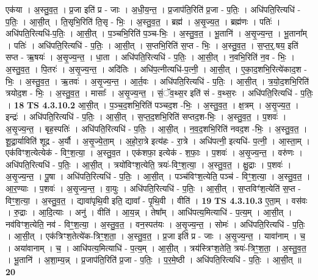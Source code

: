 \documentclass[17pt]{extarticle}
\begin{document}
                  एक॑या । अ॒स्तु॒व॒त॒ । प्र॒जा इति॑ प्र - जाः । अ॒धी॒य॒न्त॒ । प्र॒जाप॑ति॒रिति॑ प्र॒जा - प॒तिः॒ । अधि॑पति॒रित्यधि॑ - प॒तिः॒ । आ॒सी॒त् । ति॒सृभि॒रिति॑ ति॒सृ - भिः॒ । अ॒स्तु॒व॒त॒ । ब्रह्म॑ । अ॒सृ॒ज्य॒त॒ । ब्रह्म॑णः । पतिः॑ । अधि॑पति॒रित्यधि॑-प॒तिः॒ । आ॒सी॒त् । प॒ञ्चभि॒रिति॑ प॒ञ्च-भिः॒ । अ॒स्तु॒व॒त॒ । भू॒तानि॑ । अ॒सृ॒ज्य॒न्त॒ । भू॒ताना᳚म् । पतिः॑ । अधि॑पति॒रित्यधि॑ - प॒तिः॒ । आ॒सी॒त् । स॒प्तभि॒रिति॑ स॒प्त - भिः॒ । अ॒स्तु॒व॒त॒ । स॒प्त॒र्॒.षय॒ इति॑ सप्त - ऋ॒षयः॑ । अ॒सृ॒ज्य॒न्त॒ । धा॒ता । अधि॑पति॒रित्यधि॑ - प॒तिः॒ । आ॒सी॒त् । न॒वभि॒रिति॑ न॒व - भिः॒ । अ॒स्तु॒व॒त॒ । पि॒तरः॑ । अ॒सृ॒ज्य॒न्त॒ । अदि॑तिः । अधि॑प॒त्नीत्यधि॑-प॒त्नी॒ । आ॒सी॒त् । ए॒का॒द॒शभि॒रित्ये॑काद॒श - भिः॒ । अ॒स्तु॒व॒त॒ । ऋ॒तवः॑ । अ॒सृ॒ज्य॒न्त॒ । आ॒र्त॒वः । अधि॑पति॒रित्यधि॑ - प॒तिः॒ । आ॒सी॒त् । त्र॒यो॒द॒शभि॒रिति॑ त्रयोद॒श - भिः॒ । अ॒स्तु॒व॒त॒ । मासाः᳚ । अ॒सृ॒ज्य॒न्त॒ । सं॒ॅव॒थ्स॒र इति॑ सं - व॒थ्स॒रः । अधि॑पति॒रित्यधि॑ - प॒तिः॒ । \textbf{  18} \newline
                  \newline
                                \textbf{ TS 4.3.10.2} \newline
                  आ॒सी॒त् । प॒ञ्च॒द॒शभि॒रिति॑ पञ्चद॒श -भिः॒ । अ॒स्तु॒व॒त॒ । क्ष॒त्रम् । अ॒सृ॒ज्य॒त॒ । इन्द्रः॑ । अधि॑पति॒रित्यधि॑ - प॒तिः॒ । आ॒सी॒त् । स॒प्त॒द॒शभि॒रिति॑ सप्तद॒श-भिः॒ । अ॒स्तु॒व॒त॒ । प॒शवः॑ । अ॒सृ॒ज्य॒न्त॒ । बृह॒स्पतिः॑ । अधि॑पति॒रित्यधि॑ - प॒तिः॒ । आ॒सी॒त् । न॒व॒द॒शभि॒रिति॑ नवद॒श -भिः॒ । अ॒स्तु॒व॒त॒ । शू॒द्रा॒र्याविति॑ शूद्र - अ॒र्यौ । अ॒सृ॒ज्ये॒ता॒म् । अ॒हो॒रा॒त्रे इत्य॑हः - रा॒त्रे । अधि॑पत्नी॒ इत्यधि॑- प॒त्नी॒ । आ॒स्ता॒म् । एक॑विꣳश॒त्येत्येक॑ - विꣳ॒॒श॒त्या॒ । अ॒स्तु॒व॒त । एक॑शफा॒ इत्येक॑ - श॒फाः॒ । प॒शवः॑ । अ॒सृ॒ज्य॒न्त॒ । वरु॑णः । अधि॑पति॒रित्यधि॑ - प॒तिः॒ । आ॒सी॒त् । त्रयो॑विꣳश॒त्येति॒ त्रयः॑-विꣳ॒॒श॒त्या॒ । अ॒स्तु॒व॒त॒ । क्षु॒द्राः । प॒शवः॑ । अ॒सृ॒ज्य॒न्त॒ । पू॒षा । अधि॑पति॒रित्यधि॑ - प॒तिः॒ । आ॒सी॒त् । पञ्च॑विꣳश॒त्येति॒ पञ्च॑ - विꣳ॒॒श॒त्या॒ । अ॒स्तु॒व॒त॒ । आ॒र॒ण्याः । प॒शवः॑ । अ॒सृ॒ज्य॒न्त॒ । वा॒युः । अधि॑पति॒रित्यधि॑ - प॒तिः॒ । आ॒सी॒त् । स॒प्तविꣳ॑श॒त्येति॑ स॒प्त - विꣳ॒॒श॒त्या॒ । अ॒स्तु॒व॒त॒ । द्यावा॑पृथि॒वी इति॒ द्यावा᳚ - पृ॒थि॒वी । वीति॑ । \textbf{  19} \newline
                  \newline
                                \textbf{ TS 4.3.10.3} \newline
                  ए॒ता॒म् । वस॑वः । रु॒द्राः । आ॒दि॒त्याः । अनु॑ । वीति॑ । आ॒य॒न्न् । तेषा᳚म् । आधि॑पत्य॒मित्याधि॑ - प॒त्य॒म् । आ॒सी॒त् । नव॑विꣳश॒त्येति॒ नव॑ - विꣳ॒॒श॒त्या॒ । अ॒स्तु॒व॒त॒ । वन॒स्पत॑यः । अ॒सृ॒ज्य॒न्त॒ । सोमः॑ । अधि॑पति॒रित्यधि॑ - प॒तिः॒ । आ॒सी॒त् । एक॑त्रिꣳश॒तेत्ये॑क-त्रिꣳ॒॒श॒ता॒ । अ॒स्तु॒व॒त॒ । प्र॒जा इति॑ प्र - जाः । अ॒सृ॒ज्य॒न्त॒ । यावा॑नाम् । च॒ । अया॑वानाम् । च॒ । आधि॑पत्य॒मित्याधि॑ - प॒त्य॒म् । आ॒सी॒त् । त्रय॑स्त्रिꣳश॒तेति॒ त्रयः॑-त्रिꣳ॒॒श॒ता॒ । अ॒स्तु॒व॒त॒ । भू॒तानि॑ । अ॒शा॒म्य॒न्न् । प्र॒जाप॑ति॒रिति॑ प्र॒जा - प॒तिः॒ । प॒र॒मे॒ष्ठी । अधि॑पति॒रित्यधि॑ - प॒तिः॒ । आ॒सी॒त् ॥ \textbf{  20} \newline
\end{document}
